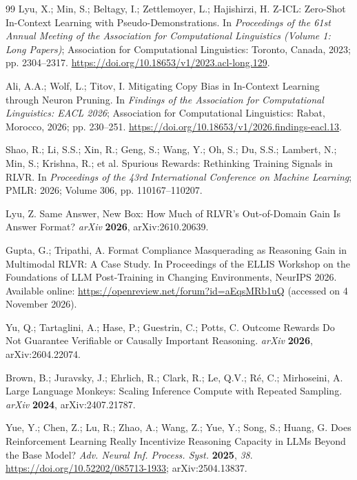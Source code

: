 \begin{thebibliography}{99}
 Lyu, X.; Min, S.; Beltagy, I.; Zettlemoyer, L.; Hajishirzi, H. Z-ICL: Zero-Shot In-Context Learning with Pseudo-Demonstrations. In \emph{Proceedings of the 61st Annual Meeting of the Association for Computational Linguistics (Volume 1: Long Papers)}; Association for Computational Linguistics: Toronto, Canada, 2023; pp. 2304--2317. \url{https://doi.org/10.18653/v1/2023.acl-long.129}.

 Ali, A.A.; Wolf, L.; Titov, I. Mitigating Copy Bias in In-Context Learning through Neuron Pruning. In \emph{Findings of the Association for Computational Linguistics: EACL 2026}; Association for Computational Linguistics: Rabat, Morocco, 2026; pp. 230--251. \url{https://doi.org/10.18653/v1/2026.findings-eacl.13}.

 Shao, R.; Li, S.S.; Xin, R.; Geng, S.; Wang, Y.; Oh, S.; Du, S.S.; Lambert, N.; Min, S.; Krishna, R.; et al. Spurious Rewards: Rethinking Training Signals in RLVR. In \emph{Proceedings of the 43rd International Conference on Machine Learning}; PMLR: 2026; Volume 306, pp. 110167--110207.

 Lyu, Z. Same Answer, New Box: How Much of RLVR's Out-of-Domain Gain Is Answer Format? \emph{arXiv} \textbf{2026}, arXiv:2610.20639.

 Gupta, G.; Tripathi, A. Format Compliance Masquerading as Reasoning Gain in Multimodal RLVR: A Case Study. In Proceedings of the ELLIS Workshop on the Foundations of LLM Post-Training in Changing Environments, NeurIPS 2026. Available online: \url{https://openreview.net/forum?id=aEqsMRb1uQ} (accessed on 4 November 2026).

 Yu, Q.; Tartaglini, A.; Hase, P.; Guestrin, C.; Potts, C. Outcome Rewards Do Not Guarantee Verifiable or Causally Important Reasoning. \emph{arXiv} \textbf{2026}, arXiv:2604.22074.

 Brown, B.; Juravsky, J.; Ehrlich, R.; Clark, R.; Le, Q.V.; R\'e, C.; Mirhoseini, A. Large Language Monkeys: Scaling Inference Compute with Repeated Sampling. \emph{arXiv} \textbf{2024}, arXiv:2407.21787.

 Yue, Y.; Chen, Z.; Lu, R.; Zhao, A.; Wang, Z.; Yue, Y.; Song, S.; Huang, G. Does Reinforcement Learning Really Incentivize Reasoning Capacity in LLMs Beyond the Base Model? \emph{Adv. Neural Inf. Process. Syst.} \textbf{2025}, \emph{38}. \url{https://doi.org/10.52202/085713-1933}; arXiv:2504.13837.


\end{thebibliography}
